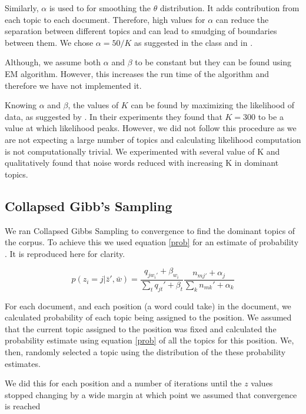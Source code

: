 \documentclass[11pt,a4paper,oneside]{article}
\begin{document}
Similarly, $\alpha$ is used to for smoothing the $\theta$ distribution. It adds contribution from each topic to each document. Therefore, high values for $\alpha$ can reduce the separation between different topics and can lead to smudging of boundaries between them. We chose $\alpha = 50/K$ as suggested in the class and in \cite{griffiths2004finding}.

Although, we assume both $\alpha$ and $\beta$ to be constant but they can be found using EM algorithm. However, this increases the run time of the algorithm and therefore we have not implemented it.

Knowing $\alpha$ and $\beta$, the values of $K$ can be found by maximizing the likelihood of data, as suggested by \cite{griffiths2004finding}. In their experiments they found that $K = 300$ to be a value at which likelihood peaks. However, we did not follow this procedure as we are not expecting a large number of topics and calculating likelihood computation is not computationally trivial. We experimented with several value of K and qualitatively found that noise words reduced with increasing K in dominant topics.

\subsection{Collapsed Gibb's Sampling}
We ran Collapsed Gibbs Sampling to convergence to find the dominant topics of the corpus. To achieve this we used equation \ref{prob} for an estimate of probability \cite{classNotes}. It is reproduced here for clarity.

\begin{equation}
p(z_i = j | \bar{z}', \bar{w}) = \frac{q_{j w_{i}'} + \beta_{w_i}}{\sum_t{q_{jt}' + \beta_t}}\frac{n_{mj'} + \alpha_j}{\sum_k{n_{mk}' + \alpha_k}}
\end{equation}

For each document, and each position (a word could take) in the document, we calculated probability of each topic being assigned to the position. We assumed that the current topic assigned to the position was fixed and calculated the probability estimate using equation \ref{prob} of all the topics for this position. We, then, randomly selected a topic using the distribution of the these probability estimates.

We did this for each position and a number of iterations until the $z$ values stopped changing by a wide margin at which point we assumed that convergence is reached
\end{document}
